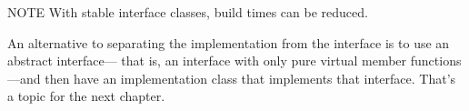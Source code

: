 \begin{myNotic}{NOTE}
With stable interface classes, build times can be reduced.
\end{myNotic}

An alternative to separating the implementation from the interface is to use an abstract interface— that is, an interface with only pure virtual member functions—and then have an implementation class that implements that interface. That’s a topic for the next chapter.












